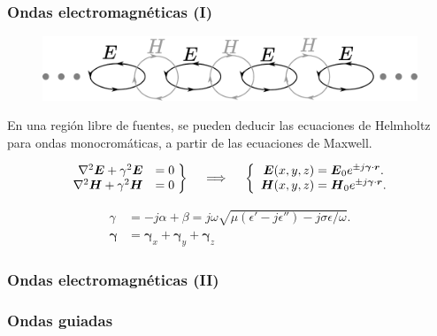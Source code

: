 \documentclass{beamer}
\renewcommand{\vec}[1]{\boldsymbol{#1}}
\begin{document}
		\begin{frame}
		\frametitle{Ondas electromagnéticas (I)}
		
		\begin{figure}[h]
			\centering
			\includegraphics[width=1\textwidth]{Presentacion/onda_em.pdf}
		\end{figure}
		
		En una región libre de fuentes, se pueden deducir las ecuaciones de Helmholtz para ondas monocromáticas, a partir de las ecuaciones de Maxwell.
				
		\begin{align*}
		\left.\begin{array}{rr@{\mskip\thickmuskip}l}
		\nabla^2  \vec{E} + \gamma^2 \vec{E} &= 0\\
		\nabla^2 \vec{H} + \gamma^2 \vec{H}& = 0
		\end{array} \right\}
		\quad \implies \quad
		\left\{\begin{array}{r@{\mskip\thickmuskip}l}
		\vec{E}(x,y,z) &= \vec{E}_0 e^{\pm j \vec{\gamma}\cdot \vec{r}}. \\
		\vec{H}(x,y,z) &= \vec{H}_0 e^{\pm j \vec{\gamma}\cdot \vec{r}}.
		\end{array}\right.
		\end{align*}
			
		\begin{align*}
		\gamma &= -j\alpha + \beta = j\omega \sqrt{\mu (\epsilon'-j\epsilon'') - j \sigma \epsilon/\omega}.\\
		\vec{\gamma} &= \vec{\gamma}_x + \vec{\gamma}_y +\vec{\gamma}_z
		\end{align*}

		\end{frame}
	
		\begin{frame}
		\frametitle{Ondas electromagnéticas (II)}
		
		
		
		
		\end{frame}
		
		\subsubsection{Ondas guiadas}
		
\end{document}
